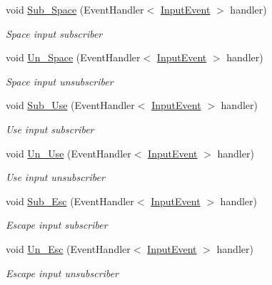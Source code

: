 \begin{DoxyCompactItemize}
void \mbox{\hyperlink{interface_g_m_t_b_1_1_input_system_1_1_i_input___manager_afeec586fb787d0e42f3362b1a465004c}{Sub\+\_\+\+Space}} (Event\+Handler$<$ \mbox{\hyperlink{class_g_m_t_b_1_1_input_system_1_1_input_event}{Input\+Event}} $>$ handler)
\begin{DoxyCompactList}\small\item\em Space input subscriber \end{DoxyCompactList}\item 
void \mbox{\hyperlink{interface_g_m_t_b_1_1_input_system_1_1_i_input___manager_a65dfb3ce87176eb4fb0a0c7342a54ade}{Un\+\_\+\+Space}} (Event\+Handler$<$ \mbox{\hyperlink{class_g_m_t_b_1_1_input_system_1_1_input_event}{Input\+Event}} $>$ handler)
\begin{DoxyCompactList}\small\item\em Space input unsubscriber \end{DoxyCompactList}\item 
void \mbox{\hyperlink{interface_g_m_t_b_1_1_input_system_1_1_i_input___manager_aabf7ae758c992a439b018f2c10937b90}{Sub\+\_\+\+Use}} (Event\+Handler$<$ \mbox{\hyperlink{class_g_m_t_b_1_1_input_system_1_1_input_event}{Input\+Event}} $>$ handler)
\begin{DoxyCompactList}\small\item\em Use input subscriber \end{DoxyCompactList}\item 
void \mbox{\hyperlink{interface_g_m_t_b_1_1_input_system_1_1_i_input___manager_a1e9eb281683c7a6b7aa1a73da1853941}{Un\+\_\+\+Use}} (Event\+Handler$<$ \mbox{\hyperlink{class_g_m_t_b_1_1_input_system_1_1_input_event}{Input\+Event}} $>$ handler)
\begin{DoxyCompactList}\small\item\em Use input unsubscriber \end{DoxyCompactList}\item 
void \mbox{\hyperlink{interface_g_m_t_b_1_1_input_system_1_1_i_input___manager_adf096b62c4736d95efdc9ce6a7f3d219}{Sub\+\_\+\+Esc}} (Event\+Handler$<$ \mbox{\hyperlink{class_g_m_t_b_1_1_input_system_1_1_input_event}{Input\+Event}} $>$ handler)
\begin{DoxyCompactList}\small\item\em Escape input subscriber \end{DoxyCompactList}\item 
void \mbox{\hyperlink{interface_g_m_t_b_1_1_input_system_1_1_i_input___manager_af635a3053e7dc57db847c9c98b122547}{Un\+\_\+\+Esc}} (Event\+Handler$<$ \mbox{\hyperlink{class_g_m_t_b_1_1_input_system_1_1_input_event}{Input\+Event}} $>$ handler)
\begin{DoxyCompactList}\small\item\em Escape input unsubscriber \end{DoxyCompactList}\end{DoxyCompactItemize}


